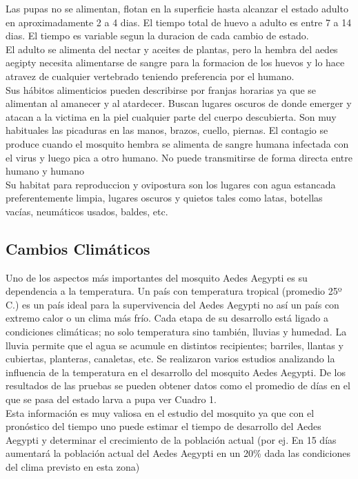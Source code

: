 Las pupas no se alimentan, flotan en la superficie hasta alcanzar el estado adulto en aproximadamente 2 a 4 dias. El tiempo total de huevo a adulto es entre 7 a 14 dias. El tiempo es variable segun la duracion de cada cambio de estado.\\

El adulto se alimenta del nectar y aceites de plantas, pero la hembra del aedes aegipty necesita alimentarse de sangre para la formacion de los huevos y lo hace atravez de cualquier vertebrado teniendo preferencia por el humano.\\

Sus hábitos alimenticios pueden describirse por franjas horarias ya que se alimentan al amanecer y al atardecer. Buscan lugares oscuros de donde emerger y atacan a la victima en la piel cualquier parte del cuerpo  descubierta. Son muy habituales las picaduras en las manos, brazos, cuello, piernas. El contagio se produce cuando el mosquito hembra se alimenta de sangre humana infectada con el virus y luego pica a otro humano. No puede transmitirse de forma directa entre humano y humano\\

Su habitat para reproduccion y ovipostura son los lugares con agua estancada preferentemente limpia, lugares oscuros y quietos tales como latas, botellas vacías, neumáticos usados, baldes, etc.\\

\subsection{Cambios Climáticos}

Uno de los aspectos más importantes del mosquito Aedes Aegypti es su dependencia a la temperatura. Un país con temperatura tropical (promedio 25º C.) es un país ideal para la supervivencia del Aedes Aegypti no así un país con extremo calor o un clima más frío. Cada etapa de su desarrollo está ligado a condiciones climáticas; no solo temperatura sino también, lluvias y humedad. La lluvia permite que el agua se acumule en distintos recipientes; barriles, llantas y cubiertas, planteras, canaletas, etc. Se realizaron varios estudios analizando la influencia de la temperatura en el desarrollo del mosquito Aedes Aegypti. De los resultados de las pruebas se pueden obtener datos como el promedio de días en el que se pasa del estado larva a pupa ver Cuadro 1.\\

Esta información es muy valiosa en el estudio del mosquito ya que con el pronóstico del tiempo uno puede estimar el tiempo de desarrollo del Aedes Aegypti y determinar el crecimiento de la población actual (por ej. En 15 días aumentará la población actual del Aedes Aegypti en un 20\% dada las condiciones del clima previsto en esta zona)

